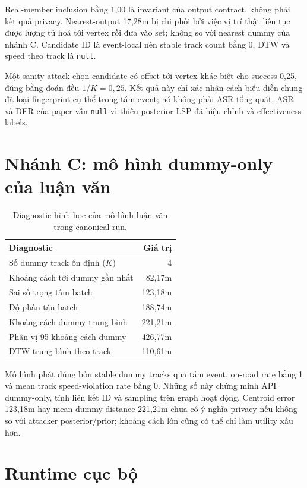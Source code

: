 \documentclass[12pt,a4paper,oneside]{report}
\begin{document}
Real-member inclusion bằng 1,00 là invariant của output contract, không phải kết quả privacy. Nearest-output 17,28m bị chi phối bởi việc vị trí thật liên tục được lượng tử hoá tới vertex rồi đưa vào set; không so với nearest dummy của nhánh C. Candidate ID là event-local nên stable track count bằng 0, DTW và speed theo track là \texttt{null}.

Một sanity attack chọn candidate có offset tới vertex khác biệt cho success 0,25, đúng bằng đoán đều $1/K=0,25$. Kết quả này chỉ xác nhận cách biểu diễn chung đã loại fingerprint cụ thể trong tám event; nó không phải ASR tổng quát. ASR và DER của paper vẫn \texttt{null} vì thiếu posterior LSP đã hiệu chỉnh và effectiveness labels.

\section{Nhánh C: mô hình dummy-only của luận văn}

\begin{table}[htbp]
\centering
\small
\caption{Diagnostic hình học của mô hình luận văn trong canonical run.}
\label{tab:thesis-results}
\begin{tabularx}{0.76\textwidth}{Y r}
\toprule
\textbf{Diagnostic} & \textbf{Giá trị} \\
\midrule
Số dummy track ổn định ($K$) & 4 \\
Khoảng cách tới dummy gần nhất & 82,17m \\
Sai số trọng tâm batch & 123,18m \\
Độ phân tán batch & 188,74m \\
Khoảng cách dummy trung bình & 221,21m \\
Phân vị 95 khoảng cách dummy & 426,77m \\
DTW trung bình theo track & 110,61m \\
\bottomrule
\end{tabularx}
\end{table}

Mô hình phát đúng bốn stable dummy tracks qua tám event, on-road rate bằng 1 và mean track speed-violation rate bằng 0. Những số này chứng minh API dummy-only, tính liên kết ID và sampling trên graph hoạt động. Centroid error 123,18m hay mean dummy distance 221,21m chưa có ý nghĩa privacy nếu không so với attacker posterior/prior; khoảng cách lớn cũng có thể chỉ làm utility xấu hơn.

\section{Runtime cục bộ}
\end{document}
